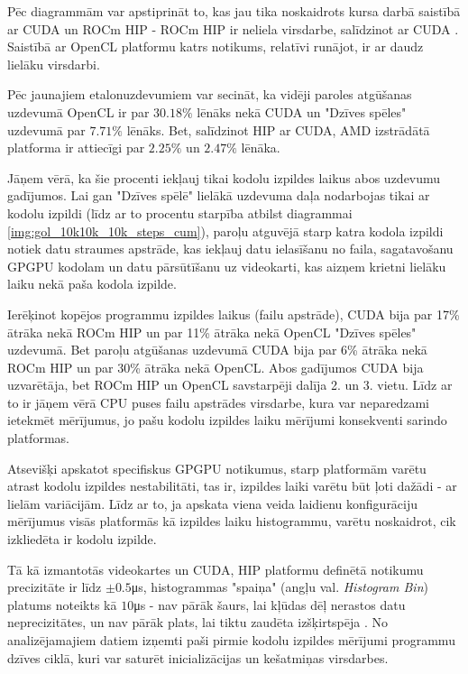 Pēc diagrammām var apstiprināt to, kas jau tika noskaidrots kursa darbā
saistībā ar CUDA un ROCm HIP - ROCm HIP ir neliela virsdarbe, salīdzinot ar
CUDA \cite{kursa-darbs}. Saistībā ar OpenCL platformu katrs notikums, relatīvi
runājot, ir ar daudz lielāku virsdarbi.

Pēc jaunajiem etalonuzdevumiem var secināt, ka vidēji paroles atgūšanas
uzdevumā OpenCL ir par \(30.18\%\) lēnāks nekā CUDA un "Dzīves spēles" uzdevumā
par \(7.71\%\) lēnāks. Bet, salīdzinot HIP ar CUDA, AMD izstrādātā platforma ir
attiecīgi par \(2.25\%\) un \(2.47\%\) lēnāka.

Jāņem vērā, ka šie procenti iekļauj tikai kodolu izpildes laikus abos uzdevumu
gadījumos. Lai gan "Dzīves spēlē" lielākā uzdevuma daļa nodarbojas tikai ar
kodolu izpildi (līdz ar to procentu starpība atbilst diagrammai
\ref{img:gol_10k10k_10k_steps_cum}), paroļu atguvējā starp katra kodola izpildi
notiek datu straumes apstrāde, kas iekļauj datu ielasīšanu no faila,
sagatavošanu GPGPU kodolam un datu pārsūtīšanu uz videokarti, kas aizņem
krietni lielāku laiku nekā paša kodola izpilde.

Ierēķinot kopējos programmu izpildes laikus (failu apstrāde), CUDA bija par
17\% ātrāka nekā ROCm HIP un par 11\% ātrāka nekā OpenCL "Dzīves spēles"
uzdevumā. Bet paroļu atgūšanas uzdevumā CUDA bija par 6\% ātrāka nekā ROCm HIP
un par 30\% ātrāka nekā OpenCL. Abos gadījumos CUDA bija uzvarētāja, bet ROCm
HIP un OpenCL savstarpēji dalīja 2. un 3. vietu. Līdz ar to ir jāņem vērā CPU
puses failu apstrādes virsdarbe, kura var neparedzami ietekmēt mērījumus, jo
pašu kodolu izpildes laiku mērījumi konsekventi sarindo platformas.

Atsevišķi apskatot specifiskus GPGPU notikumus, starp platformām varētu atrast
kodolu izpildes nestabilitāti, tas ir, izpildes laiki varētu būt ļoti dažādi -
ar lielām variācijām. Līdz ar to, ja apskata viena veida laidienu konfigurāciju
mērījumus visās platformās kā izpildes laiku histogrammu, varētu noskaidrot, cik
izkliedēta  ir kodolu izpilde.

Tā kā izmantotās videokartes un CUDA, HIP platformu definētā notikumu
precizitāte ir līdz \(\pm0.5\)\si{\micro\second}, histogrammas "spaiņa" (angļu
val. \textit{Histogram Bin}) platums noteikts kā \(10\)\si{\micro\second} - nav
pārāk šaurs, lai kļūdas dēļ nerastos datu neprecizitātes, un nav pārāk plats,
lai tiktu zaudēta izšķirtspēja \cite{Freedman1981}. No analizējamajiem datiem
izņemti paši pirmie kodolu izpildes mērījumi programmu dzīves ciklā, kuri var
saturēt inicializācijas un kešatmiņas virsdarbes.

